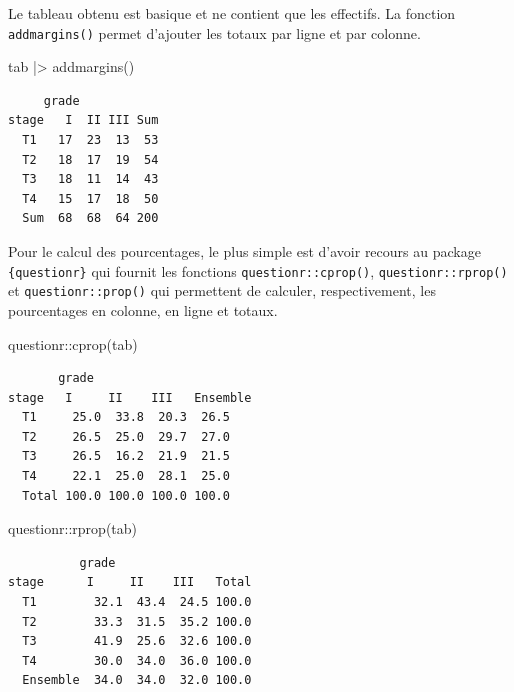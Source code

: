 \documentclass[
  letterpaper,
  DIV=11,
  numbers=noendperiod,
  oneside]{scrreprt}
\newenvironment{Shaded}{\begin{snugshade}}{\end{snugshade}}
\newcommand{\FunctionTok}[1]{\textcolor[rgb]{0.28,0.35,0.67}{#1}}
\newcommand{\NormalTok}[1]{\textcolor[rgb]{0.00,0.23,0.31}{#1}}
\newcommand{\SpecialCharTok}[1]{\textcolor[rgb]{0.37,0.37,0.37}{#1}}
\begin{document}
Le tableau obtenu est basique et ne contient que les effectifs. La
fonction \texttt{addmargins()} permet d'ajouter les totaux par ligne et
par colonne.

\begin{Shaded}
\begin{Highlighting}[]
\NormalTok{tab }\SpecialCharTok{|\textgreater{}} \FunctionTok{addmargins}\NormalTok{()}
\end{Highlighting}
\end{Shaded}

\begin{verbatim}
     grade
stage   I  II III Sum
  T1   17  23  13  53
  T2   18  17  19  54
  T3   18  11  14  43
  T4   15  17  18  50
  Sum  68  68  64 200
\end{verbatim}

Pour le calcul des pourcentages, le plus simple est d'avoir recours au
package \texttt{\{questionr\}} qui fournit les fonctions
\texttt{questionr::cprop()}, \texttt{questionr::rprop()} et
\texttt{questionr::prop()} qui permettent de calculer, respectivement,
les pourcentages en colonne, en ligne et totaux.

\begin{Shaded}
\begin{Highlighting}[]
\NormalTok{questionr}\SpecialCharTok{::}\FunctionTok{cprop}\NormalTok{(tab)}
\end{Highlighting}
\end{Shaded}

\begin{verbatim}
       grade
stage   I     II    III   Ensemble
  T1     25.0  33.8  20.3  26.5   
  T2     26.5  25.0  29.7  27.0   
  T3     26.5  16.2  21.9  21.5   
  T4     22.1  25.0  28.1  25.0   
  Total 100.0 100.0 100.0 100.0   
\end{verbatim}

\begin{Shaded}
\begin{Highlighting}[]
\NormalTok{questionr}\SpecialCharTok{::}\FunctionTok{rprop}\NormalTok{(tab)}
\end{Highlighting}
\end{Shaded}

\begin{verbatim}
          grade
stage      I     II    III   Total
  T1        32.1  43.4  24.5 100.0
  T2        33.3  31.5  35.2 100.0
  T3        41.9  25.6  32.6 100.0
  T4        30.0  34.0  36.0 100.0
  Ensemble  34.0  34.0  32.0 100.0
\end{verbatim}
\end{document}
